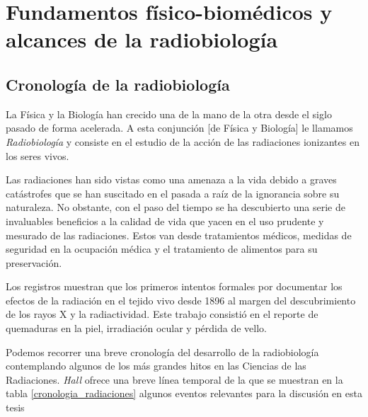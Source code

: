 \documentclass[12pt,letterpaper, oneside]{book}
\begin{document}
	\chapter{Fundamentos físico-biomédicos y alcances de la radiobiología}\label{fundamentos_fisico_biomedicos}
		\section{Cronología de la radiobiología}
		La Física y la Biología han crecido una de la mano de la otra desde el siglo pasado de forma acelerada. A esta conjunción [de Física y Biología] le llamamos \textit{Radiobiología} y consiste en el estudio de la acción de las radiaciones ionizantes en los seres vivos\cite{Hall.2000}. 
		
		Las radiaciones han sido vistas como una amenaza a la vida debido a graves catástrofes que se han suscitado en el pasada a raíz de la ignorancia sobre su naturaleza\cite{Prasad.1995}. No obstante, con el paso del tiempo se ha descubierto una serie de invaluables beneficios a la calidad de vida que yacen en el uso prudente y mesurado de las radiaciones. Estos van desde tratamientos médicos, medidas de seguridad en la ocupación médica y el tratamiento de alimentos para su preservación\cite{Prasad.1995}. 
		
		Los registros muestran que los primeros intentos formales por documentar los efectos de la radiación en el tejido vivo desde 1896 al margen del descubrimiento de los rayos X y la radiactividad\cite{Hall.2000}. Este trabajo consistió en el reporte de quemaduras en la piel, irradiación ocular y pérdida de vello. 
		
		Podemos recorrer una breve cronología del desarrollo de la radiobiología contemplando algunos de los más grandes hitos en las Ciencias de las Radiaciones. \textit{Hall} ofrece una breve línea temporal de la que se muestran en la tabla \ref{cronologia_radiaciones} algunos eventos relevantes para la discusión en esta tesis
		
\end{document}
